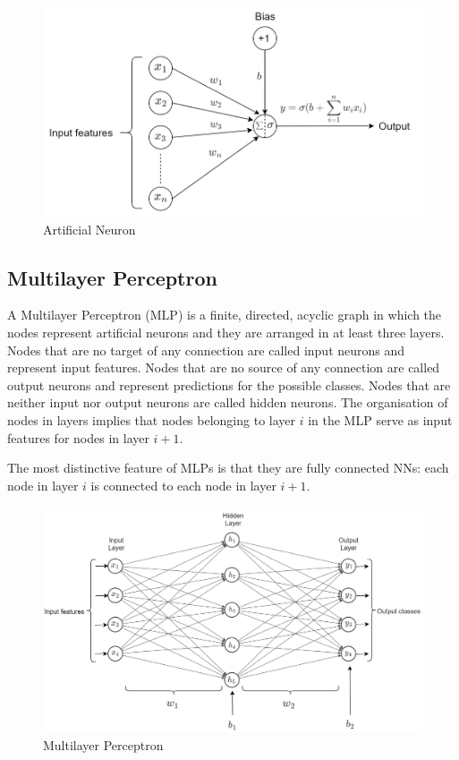 \begin{figure}[H]
  \centering
  \includegraphics[scale = 0.5]{Images/artificial_neuron.png}
  \caption{Artificial Neuron}
  \label{Artificial Neuron}
\end{figure}

\subsection{Multilayer Perceptron}

A Multilayer Perceptron (MLP) is a finite, directed, acyclic graph in which the nodes represent artificial neurons and they are arranged in at least three layers. Nodes that are no target of any connection are called input neurons and represent input features. Nodes that are no source of any connection are called output neurons and represent predictions for the possible classes. Nodes that are neither input nor output neurons are called hidden neurons. The organisation of nodes in layers implies that nodes belonging to layer $i$ in the MLP serve as input features for nodes in layer $i+1$.

The most distinctive feature of MLPs is that they are fully connected NNs: each node in layer $i$ is connected to each node in layer $i+1$.

\begin{figure}[H]
  \centering
  \includegraphics[scale = 0.5]{Images/mlp.png}
  \caption{Multilayer Perceptron}
  \label{Multilayer Perceptron}
\end{figure}

